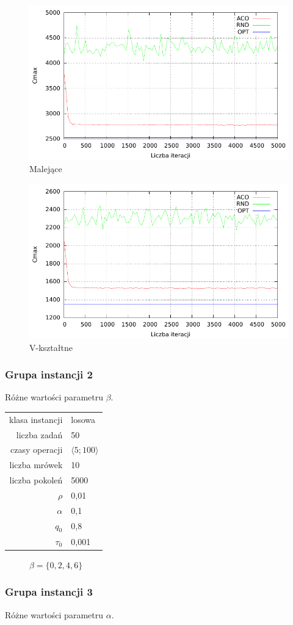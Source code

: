 \documentclass[10pt,a4paper]{article}
\begin{document}
\newpage
\begin{figure}[h]
    \centering
    \includegraphics{./figures/inst03_dsc_smooth.pdf}
    \caption{Malejące}
\end{figure}


\newpage
\begin{figure}[h]
    \centering
    \includegraphics{./figures/inst04_vsh_smooth.pdf}
    \caption{V-kształtne}
\end{figure}


\newpage
\subsubsection{Grupa instancji 2}
Różne wartości parametru $\beta$.

\begin{center}
\begin{tabular}{|r|l|}
  \hline
  klasa instancji & losowa \\
  liczba zadań & 50 \\
  czasy operacji & $ \langle 5;100 \rangle $  \\
  liczba mrówek & 10 \\
  liczba pokoleń & 5000 \\
  $ \rho $ & 0,01 \\
  $ \alpha $ & 0,1 \\
  $ q_0 $ & 0,8 \\
  $ \tau_0 $ & 0,001 \\
  \hline
\end{tabular}
\end{center}

\begin{figure}[h]
    \centering
    \caption{$ \beta = \{ 0, 2, 4, 6 \} $}
\end{figure}


\newpage
\subsubsection{Grupa instancji 3}
Różne wartości parametru $\alpha$.
\end{document}
